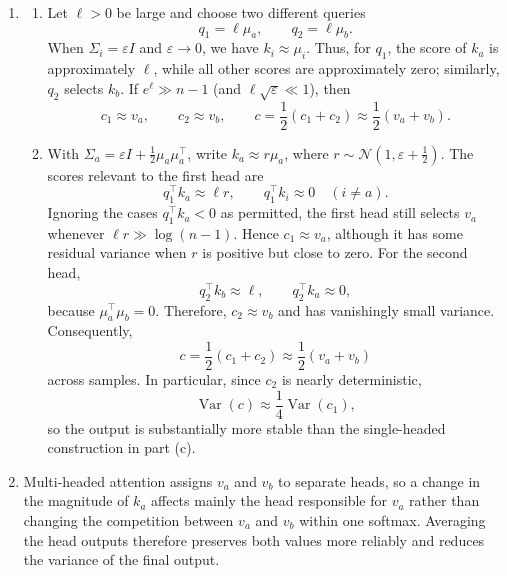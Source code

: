 \documentclass[11pt, a4paper, oneside]{article}
\begin{document}
\begin{enumerate}[label=(\alph*), left=0pt, labelsep=1em, itemsep=1em]
    \item
    \begin{enumerate}[label=\roman*., left=0pt, labelsep=1em, itemsep=1em]
        \item Let $\ell>0$ be large and choose two different queries
        \[
            q_1=\ell\mu_a,
            \qquad
            q_2=\ell\mu_b.
        \]
        When $\Sigma_i=\varepsilon I$ and $\varepsilon\to0$, we have
        $k_i\approx\mu_i$. Thus, for $q_1$, the score of $k_a$ is
        approximately $\ell$, while all other scores are approximately zero;
        similarly, $q_2$ selects $k_b$. If $e^\ell\gg n-1$ (and
        $\ell\sqrt{\varepsilon}\ll1$), then
        \[
            c_1\approx v_a,
            \qquad
            c_2\approx v_b,
            \qquad
            c=\frac12(c_1+c_2)\approx\frac12(v_a+v_b).
        \]

        \item With
        $\Sigma_a=\varepsilon I+\frac12\mu_a\mu_a^\top$, write
        $k_a\approx r\mu_a$, where
        $r\sim\mathcal N(1,\varepsilon+\frac12)$. The scores relevant to the
        first head are
        \[
            q_1^\top k_a\approx\ell r,
            \qquad
            q_1^\top k_i\approx0\quad(i\neq a).
        \]
        Ignoring the cases $q_1^\top k_a<0$ as permitted, the first head still
        selects $v_a$ whenever $\ell r\gg\log(n-1)$. Hence
        $c_1\approx v_a$, although it has some residual variance when $r$ is
        positive but close to zero. For the second head,
        \[
            q_2^\top k_b\approx\ell,
            \qquad
            q_2^\top k_a\approx0,
        \]
        because $\mu_a^\top\mu_b=0$. Therefore, $c_2\approx v_b$ and has
        vanishingly small variance. Consequently,
        \[
            c=\frac12(c_1+c_2)\approx\frac12(v_a+v_b)
        \]
        across samples. In particular, since $c_2$ is nearly deterministic,
        \[
            \operatorname{Var}(c)
            \approx\frac14\operatorname{Var}(c_1),
        \]
        so the output is substantially more stable than the single-headed
        construction in part (c).
    \end{enumerate}

    \item Multi-headed attention assigns $v_a$ and $v_b$ to separate heads,
    so a change in the magnitude of $k_a$ affects mainly the head responsible
    for $v_a$ rather than changing the competition between $v_a$ and $v_b$
    within one softmax. Averaging the head outputs therefore preserves both
    values more reliably and reduces the variance of the final output.
\end{enumerate}
\newpage
\end{document}
